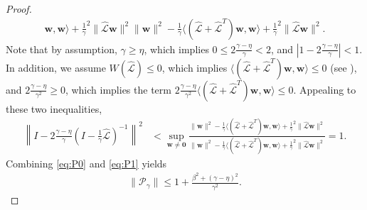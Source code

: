 \documentclass[review]{siamart}
\begin{document}
\begin{proof}
{\begin{align*}
{		\mathbf{w},\mathbf{w}\rangle + \tfrac{1}{\gamma}^2\|\widehat{\mathcal{L}}\mathbf{w}\|^2}
	{\|\mathbf{w}\|^2 - \tfrac{1}{\gamma}\langle (\widehat{\mathcal{L}} + \widehat{\mathcal{L}}^T)
		\mathbf{w},\mathbf{w}\rangle + \tfrac{1}{\gamma}^2\|\widehat{\mathcal{L}}\mathbf{w}\|^2}.
\end{align*}
}
%
Note that by assumption, $\gamma \geq \eta$, which implies
$0 \leq 2\tfrac{\gamma-\eta}{\gamma}  < 2$, and 
$|1 - 2\tfrac{\gamma-\eta}{\gamma}| < 1$. In addition, we assume $W(\widehat{\mathcal{L}})\leq 0$,
which implies $\langle (\widehat{\mathcal{L}}+\widehat{\mathcal{L}}^T)\mathbf{w},\mathbf{w}\rangle \leq 0$
(see ), and
$2\tfrac{\gamma-\eta}{\gamma^2} \geq 0$, which implies the term
$2\tfrac{\gamma-\eta}{\gamma^2}\langle (\widehat{\mathcal{L}}+\widehat{\mathcal{L}}^T)
	\mathbf{w},\mathbf{w}\rangle\leq 0$. Appealing to these two inequalities,
%
\begin{align} \label{eq:P1}
\left\| I - 2\tfrac{\gamma-\eta}
	{\gamma}(I - \tfrac{1}{\gamma}\widehat{\mathcal{L}})^{-1}\right\|^2
& < \sup_{\mathbf{w}\neq\mathbf{0}} \frac{\|\mathbf{w}\|^2
	- \tfrac{1}{\gamma}\langle (\widehat{\mathcal{L}} + \widehat{\mathcal{L}}^T)
		\mathbf{w},\mathbf{w}\rangle + \tfrac{1}{\gamma}^2\|\widehat{\mathcal{L}}\mathbf{w}\|^2}
	{\|\mathbf{w}\|^2 - \tfrac{1}{\gamma}\langle (\widehat{\mathcal{L}} + \widehat{\mathcal{L}}^T)
		\mathbf{w},\mathbf{w}\rangle + \tfrac{1}{\gamma}^2\|\widehat{\mathcal{L}}\mathbf{w}\|^2} 
= 1.
\end{align}
%
Combining \eqref{eq:P0} and \eqref{eq:P1} yields
%
\begin{align}\label{eq:Pgamma}
\|\mathcal{P}_\gamma\| \leq 1 + \frac{\beta^2 + (\gamma-\eta)^2}{\gamma^2}.
\end{align}


\end{proof}
\end{document}
